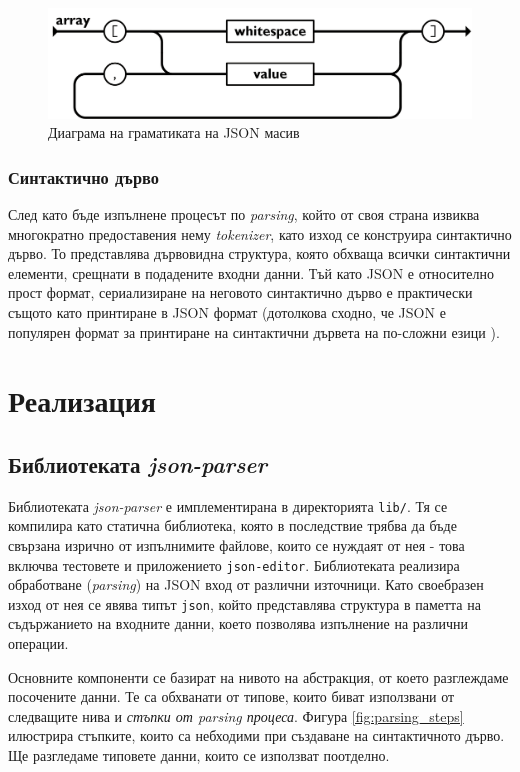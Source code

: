 \documentclass[10pt]{article}
\begin{document}
\begin{figure}[h]
\centering
\includegraphics[width=.65\linewidth]{array_grammar.png}
\caption{Диаграма на граматиката на JSON масив \autocite{jsonorg}}
\label{fig:array_grammar}
\end{figure}

\subsubsection{Синтактично дърво}
След като бъде изпълнене процесът по \textit{parsing}, който от своя страна извиква многократно предоставения нему \textit{tokenizer}, като изход се конструира синтактично дърво. То представлява дървовидна структура, която обхваща всички синтактични елементи, срещнати в подадените входни данни. Тъй като JSON е относително прост формат, сериализиране на неговото синтактично дърво е практически същото като принтиране в JSON формат (дотолкова сходно, че JSON е популярен формат за принтиране на синтактични дървета на по-сложни езици \autocite{llvm_astdump}).

\section{Реализация}

\subsection{Библиотеката \textit{json-parser}} \label{json-parser-impl}

\par
Библиотеката \textit{json-parser} е имплементирана в директорията \verb|lib/|. Тя се компилира като статична библиотека, която в последствие трябва да бъде свързана изрично от изпълнимите файлове, които се нуждаят от нея - това включва тестовете и приложението \verb|json-editor|. Библиотеката реализира обработване (\textit{parsing}) на JSON вход от различни източници. Като своебразен изход от нея се явява типът \verb|json|, който представлява структура в паметта на съдържанието на входните данни, което позволява изпълнение на различни операции.

\par
Основните компоненти се базират на нивото на абстракция, от което разглеждаме посочените данни. Те са обхванати от типове, които биват използвани от следващите нива и \textit{стъпки от parsing процеса}. Фигура \ref{fig:parsing_steps} илюстрира стъпките, които са небходими при създаване на синтактичното дърво. Ще разгледаме типовете данни, които се използват поотделно.
\end{document}
